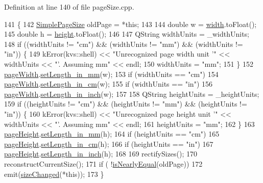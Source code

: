 Definition at line 140 of file page\+Size.\+cpp.


\begin{DoxyCode}
141 \{
142   \hyperlink{classSimplePageSize}{SimplePageSize} oldPage = *\textcolor{keyword}{this};
143 
144   \textcolor{keywordtype}{double} w = \hyperlink{classSimplePageSize_a5866f4c04635b09ec065a1fc45f9d1df}{width}.toFloat();
145   \textcolor{keywordtype}{double} h = \hyperlink{classSimplePageSize_a8df6b43628bff9c8b53f26cc478640c5}{height}.toFloat();
146 
147   QString widthUnits = \_widthUnits;
148   \textcolor{keywordflow}{if} ((widthUnits != \textcolor{stringliteral}{"cm"}) && (widthUnits != \textcolor{stringliteral}{"mm"}) && (widthUnits != \textcolor{stringliteral}{"in"})) \{
149     kError(kvs::shell) << \textcolor{stringliteral}{"Unrecognized page width unit '"} << widthUnits << \textcolor{stringliteral}{"'. Assuming mm"} << endl;
150     widthUnits = \textcolor{stringliteral}{"mm"};
151   \}
152   \hyperlink{classSimplePageSize_ad5aa26a1789bd7b20dbca509a50cfcab}{pageWidth}.\hyperlink{classLength_ae3aabced262567871a1df58c1a878b60}{setLength\_in\_mm}(w);
153   \textcolor{keywordflow}{if} (widthUnits == \textcolor{stringliteral}{"cm"})
154     \hyperlink{classSimplePageSize_ad5aa26a1789bd7b20dbca509a50cfcab}{pageWidth}.\hyperlink{classLength_a4ccc72a3e9be9c00a0901a0c3c31e907}{setLength\_in\_cm}(w);
155   \textcolor{keywordflow}{if} (widthUnits == \textcolor{stringliteral}{"in"})
156     \hyperlink{classSimplePageSize_ad5aa26a1789bd7b20dbca509a50cfcab}{pageWidth}.\hyperlink{classLength_af5a9d0ca3a93d6c2c304ca5ac445aa44}{setLength\_in\_inch}(w);
157 
158   QString heightUnits = \_heightUnits;
159   \textcolor{keywordflow}{if} ((heightUnits != \textcolor{stringliteral}{"cm"}) && (heightUnits != \textcolor{stringliteral}{"mm"}) && (heightUnits != \textcolor{stringliteral}{"in"})) \{
160     kError(kvs::shell) << \textcolor{stringliteral}{"Unrecognized page height unit '"} << widthUnits << \textcolor{stringliteral}{"'. Assuming mm"} << endl;
161     heightUnits = \textcolor{stringliteral}{"mm"};
162   \}
163   \hyperlink{classSimplePageSize_a0e0bc8a9833d9c276f96e6fda5c64cf7}{pageHeight}.\hyperlink{classLength_ae3aabced262567871a1df58c1a878b60}{setLength\_in\_mm}(h);
164   \textcolor{keywordflow}{if} (heightUnits == \textcolor{stringliteral}{"cm"})
165     \hyperlink{classSimplePageSize_a0e0bc8a9833d9c276f96e6fda5c64cf7}{pageHeight}.\hyperlink{classLength_a4ccc72a3e9be9c00a0901a0c3c31e907}{setLength\_in\_cm}(h);
166   \textcolor{keywordflow}{if} (heightUnits == \textcolor{stringliteral}{"in"})
167     \hyperlink{classSimplePageSize_a0e0bc8a9833d9c276f96e6fda5c64cf7}{pageHeight}.\hyperlink{classLength_af5a9d0ca3a93d6c2c304ca5ac445aa44}{setLength\_in\_inch}(h);
168 
169   rectifySizes();
170   reconstructCurrentSize();
171   \textcolor{keywordflow}{if} ( !\hyperlink{classSimplePageSize_acb4b951dcef3b5b94e2c6d1942e833e6}{isNearlyEqual}(oldPage))
172     emit(\hyperlink{classpageSize_ae49ee59892403f920d614d0c8d9daa5b}{sizeChanged}(*\textcolor{keyword}{this}));
173 \}
\end{DoxyCode}
